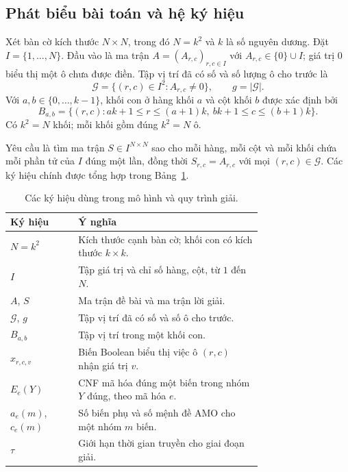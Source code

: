 \documentclass[a4paper,fleqn]{cas-sc}
\begin{document}
\subsection{Phát biểu bài toán và hệ ký hiệu}

Xét bàn cờ kích thước $N\times N$, trong đó $N=k^2$ và $k$ là số nguyên
dương. Đặt $I=\{1,\ldots,N\}$. Đầu vào là ma trận
$A=(A_{r,c})_{r,c\in I}$ với $A_{r,c}\in\{0\}\cup I$; giá trị $0$ biểu
thị một ô chưa được điền. Tập vị trí đã có số và số lượng ô cho trước là
\begin{equation}
 \mathcal{G}=\{(r,c)\in I^2:A_{r,c}\neq0\},
 \qquad g=|\mathcal{G}|.
 \label{eq:method-givens-set}
\end{equation}
Với $a,b\in\{0,\ldots,k-1\}$, khối con ở hàng khối $a$ và cột khối $b$
được xác định bởi
\begin{equation}
 B_{a,b}=\{(r,c):ak+1\leq r\leq(a+1)k,
                      \ bk+1\leq c\leq(b+1)k\}.
 \label{eq:method-box-definition}
\end{equation}
Có $k^2=N$ khối; mỗi khối gồm đúng $k^2=N$ ô.

Yêu cầu là tìm ma trận $S\in I^{N\times N}$ sao cho mỗi hàng, mỗi cột
và mỗi khối chứa mỗi phần tử của $I$ đúng một lần, đồng thời
$S_{r,c}=A_{r,c}$ với mọi $(r,c)\in\mathcal{G}$.
Các ký hiệu chính được tổng hợp trong
Bảng~\ref{tab:method-notation}.

\begin{table}[pos=htbp]
 \centering
 \caption{Các ký hiệu dùng trong mô hình và quy trình giải.}
 \label{tab:method-notation}
 \begin{tabular}{lp{0.73\linewidth}}
  \toprule
  Ký hiệu & Ý nghĩa \\
  \midrule
  $N=k^2$ & Kích thước cạnh bàn cờ; khối con có kích thước $k\times k$. \\
  $I$ & Tập giá trị và chỉ số hàng, cột, từ $1$ đến $N$. \\
  $A$, $S$ & Ma trận đề bài và ma trận lời giải. \\
  $\mathcal{G}$, $g$ & Tập vị trí đã có số và số ô cho trước. \\
  $B_{a,b}$ & Tập vị trí trong một khối con. \\
  $x_{r,c,v}$ & Biến Boolean biểu thị việc ô $(r,c)$ nhận giá trị $v$. \\
  $E_e(Y)$ & CNF mã hóa đúng một biến trong nhóm $Y$ đúng, theo mã hóa $e$. \\
  $a_e(m)$, $c_e(m)$ & Số biến phụ và số mệnh đề AMO cho một nhóm $m$ biến. \\
  $\tau$ & Giới hạn thời gian truyền cho giai đoạn giải. \\
  \bottomrule
 \end{tabular}
\end{table}
\end{document}
